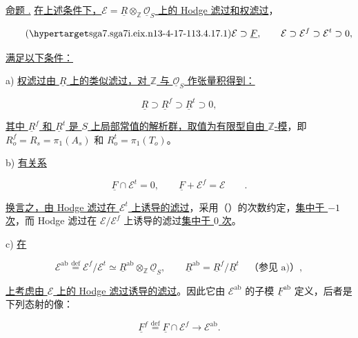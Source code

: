 \medskip
\noindent
\underline{命题 .} \underline{在上述条件下，$\mathcal E=\underline R\otimes_{\mathbb Z}\underline{\mathcal O}_S$ 上的 Hodge 滤过和权滤过}，

\begin{equation}\tag{\SGARefTarget{sga7.sga7i.eix.n13-4-17-1}{13.4.17.1}}
 \mathcal E\supset\underline F,
 \qquad
 \mathcal E\supset\mathcal E^f\supset\mathcal E^t\supset0,
\end{equation}

\noindent
\underline{满足以下条件：}

\smallskip
\noindent
a) \underline{权滤过由 $\underline R$ 上的类似滤过，对 $\mathbb Z$ 与 $\underline{\mathcal O}_S$ 作张量积得到：}

\begin{equation*}
 \underline R\supset\underline R^f\supset\underline R^t\supset0,
\end{equation*}

\noindent
\underline{其中 $\underline R^f$ 和 $\underline R^t$ 是 $S$ 上局部常值的解析群，取值为有限型自由 $\mathbb Z$-模}，即 $R_o^f=R_s=\pi_1(A_s)$ 和 $R_o^t=\pi_1(T_o)$。

\smallskip
\noindent
b) \underline{有关系}

\begin{equation}\tag{*}
 \underline F\cap\mathcal E^t=0,
 \qquad \underline F+\mathcal E^f=\mathcal E\qquad .
\end{equation}

\noindent
\underline{换言之，由 Hodge 滤过在 $\mathcal E^t$ 上诱导的滤过}，采用（）的次数约定，\underline{集中于 $-1$ 次}，而 Hodge 滤过在 $\mathcal E/\mathcal E^f$ 上诱导的滤过\underline{集中于 $0$ 次}。

\smallskip
\noindent
c) \underline{在}

\begin{equation*}
 \mathcal E^{\mathrm{ab}}
 \stackrel{\mathrm{def}}{=}\mathcal E^f/\mathcal E^t
 \simeq\underline R^{\mathrm{ab}}\otimes_{\mathbb Z}
 \underline{\mathcal O}_S,
 \qquad
 \underline R^{\mathrm{ab}}=\underline R^f/\underline R^t
 \quad\text{（参见 a)）},
\end{equation*}

\noindent
\underline{上考虑由 $\mathcal E$ 上的 Hodge 滤过诱导的滤过}。因此它由 $\mathcal E^{\mathrm{ab}}$ 的子模 $\underline F^{\mathrm{ab}}$ 定义，后者是下列态射的像：

\begin{equation*}
 \underline F^f\stackrel{\mathrm{def}}{=}
 \underline F\cap\mathcal E^f\longrightarrow\mathcal E^{\mathrm{ab}}.
\end{equation*}

